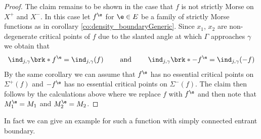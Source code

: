 \begin{proof}
  The claim remains to be shown in the case that $f$ is not strictly Morse on $X^+$ and $X^-$. In this case let
  $f^\e$ for $\e\in E$ be a family of strictly Morse functions as in corollary \ref{co:density_boundaryGeneric}.
  Since $x_1$, $x_2$ are non-degenerate critical points of $f$
  due to the slanted angle at which
  $\Gamma$ approaches $\gamma$
  we obtain that
  \begin{align}
    \ind_{j,\gamma}\brk*{f^\e}=\ind_{j,\gamma}(f)\qquad\text{ and }\qquad 
    \ind_{j,\gamma}\brk*{-f^\e}=\ind_{j,\gamma}(-f)
    \label{eq:n3_disproof_morse_indexApprox}
  \end{align}
  By the same corollary we can assume that $f^\e$ has no essential critical points on
  $\Sigma^+(f)$ and $-f^\e$ has no essential critical points on $\Sigma^-(f)$.
  The claim then follows by the calculations above where we replace
  $f$ with $f^\e$ and then note that $M_1^\e=M_1$ and $M_2^\e=M_2$.
\end{proof}
In fact we can give an example for such a function with
simply connected entrant boundary.
